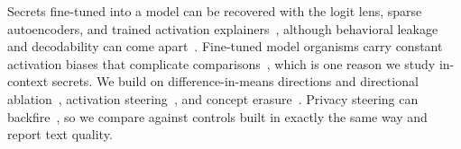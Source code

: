 Secrets fine-tuned into a model can be recovered with the logit lens, sparse autoencoders, and trained activation explainers~\citep{cywinski2025taboo,cywinski2025eliciting,karvonen2025oracles}, although behavioral leakage and decodability can come apart~\citep{bersia2026blindspots}. Fine-tuned model organisms carry constant activation biases that complicate comparisons~\citep{minder2025narrow}, which is one reason we study in-context secrets. We build on difference-in-means directions and directional ablation~\citep{arditi2024refusal}, activation steering~\citep{turner2023actadd,rimsky2023caa}, and concept erasure~\citep{belrose2023leace}. Privacy steering can backfire~\citep{wang2026privacy}, so we compare against controls built in exactly the same way and report text quality.
